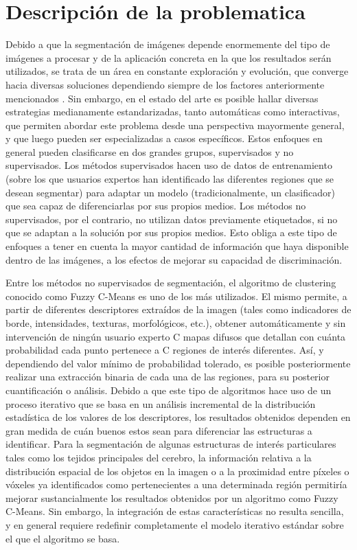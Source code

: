 \section{Descripción de la problematica}
Debido a que la segmentación de imágenes depende enormemente del tipo de imágenes a procesar y de la aplicación concreta en la que los resultados serán utilizados, se trata de un área en constante exploración y evolución, que converge hacia diversas soluciones dependiendo siempre de los factores anteriormente mencionados \cite{Bankman_2009}. Sin embargo, en el estado del arte es posible hallar diversas estrategias medianamente estandarizadas, tanto automáticas como interactivas, que permiten abordar este problema desde una perspectiva mayormente general, y que luego pueden ser especializadas a casos específicos. Estos enfoques en general pueden clasificarse en dos grandes grupos, supervisados y no supervisados. Los métodos supervisados hacen uso de datos de entrenamiento (sobre los que usuarios expertos han identificado las diferentes regiones que se desean segmentar) para adaptar un modelo (tradicionalmente, un clasificador) que sea capaz de diferenciarlas por sus propios medios. Los métodos no supervisados, por el contrario, no utilizan datos previamente etiquetados, si no que se adaptan a la solución por sus propios medios. Esto obliga a este tipo de enfoques a tener en cuenta la mayor cantidad de información que haya disponible dentro de las imágenes, a los efectos de mejorar su capacidad de discriminación.

Entre los métodos no supervisados de segmentación, el algoritmo de clustering conocido como Fuzzy C-Means es uno de los más utilizados. El mismo permite, a partir de diferentes descriptores extraídos  de la imagen (tales como indicadores de borde, intensidades, texturas, morfológicos, etc.), obtener automáticamente y sin intervención de ningún usuario experto C mapas difusos que detallan con cuánta probabilidad cada punto pertenece a C regiones de interés diferentes. Así, y dependiendo del valor mínimo de probabilidad tolerado, es posible posteriormente realizar una extracción binaria de cada una de las regiones, para su posterior cuantificación o análisis. Debido a que este tipo de algoritmos hace uso de un proceso iterativo que se basa en un análisis incremental de la distribución estadística de los valores de los descriptores, los resultados obtenidos dependen en gran medida de cuán buenos estos sean para diferenciar las estructuras a identificar. Para la segmentación de algunas estructuras de interés particulares tales como los tejidos principales del cerebro, la información relativa a la distribución espacial de los objetos en la imagen o a la proximidad entre píxeles o vóxeles ya identificados como pertenecientes a una determinada región permitiría mejorar sustancialmente los resultados obtenidos por un algoritmo como Fuzzy C-Means. Sin embargo, la integración de estas características no resulta sencilla, y en general requiere redefinir completamente el modelo iterativo estándar sobre el que el algoritmo se basa.

